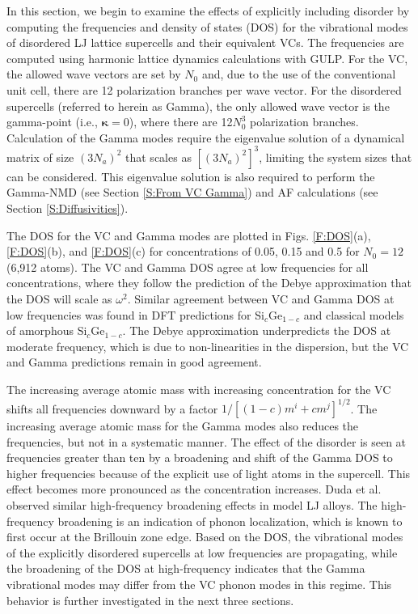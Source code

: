 \documentclass[aps,prb,onecolumn,preprint,footinbib,superscriptaddress,amsmath,amssymb,floatfix]{revtex4}
\begin{document}
In this section, we begin to examine the effects of explicitly including 
disorder by computing the frequencies and density of states (DOS)  
for the vibrational modes of disordered LJ lattice supercells and their 
equivalent VCs. The frequencies 
are computed using harmonic lattice dynamics calculations with  
GULP.\cite{gale_general_2003}  For the 
VC, the allowed wave vectors are set by $N_0$ and, due to the use of the 
conventional unit cell, there are 12 
polarization branches per wave vector.  
For the disordered supercells (referred to herein as Gamma),
the only allowed wave vector is the gamma-point (i.e., $\pmb{\kappa}=0$),  
where there are 12$N_0^3$ polarization branches. Calculation of the 
Gamma modes require the eigenvalue solution of a dynamical matrix of size 
$(3N_a)^2$ that scales as $[(3N_a)^2]^3$, limiting the system 
sizes that can be considered. This eigenvalue solution is also 
required to perform the Gamma-NMD (see Section \ref{S:From VC Gamma})  
and AF calculations (see Section \ref{S:Diffusivities}). 

The DOS for the VC and Gamma modes are plotted in Figs. \ref{F:DOS}(a), 
\ref{F:DOS}(b), and \ref{F:DOS}(c) 
for concentrations of 0.05, 0.15 and 0.5 for 
$N_0=12$ (6,912 atoms). The VC and Gamma DOS 
agree at low frequencies for all concentrations, 
where they follow the prediction of the Debye approximation that 
the DOS will scale as $\omega^2$.\cite{ashcroft_solid_1976} 
Similar agreement between VC and Gamma DOS at low frequencies 
was found in DFT predictions 
for Si$_c$Ge$_{1-c}$\cite{garg_role_2011} and 
classical models of amorphous Si$_c$Ge$_{1-c}$.
\cite{bouchard_vibrational_1988} The Debye approximation 
underpredicts the DOS at moderate frequency, which is due to 
non-linearities in the dispersion,\cite{ashcroft_solid_1976} but the 
VC and Gamma predictions remain in good agreement. 

The increasing average atomic  
mass with increasing concentration for the VC shifts all   
frequencies downward by a factor $1/[(1-c)m^i + cm^j]^{1/2}$. 
The increasing average atomic 
mass for the Gamma modes also reduces the frequencies, but not in a 
systematic manner. 
The effect of the disorder is seen at frequencies greater than 
ten by a broadening and shift of the Gamma DOS to higher frequencies 
because of the explicit use of light atoms in the supercell. This effect 
becomes more pronounced as the concentration increases.  
Duda et al. 
observed similar high-frequency broadening effects in model LJ alloys.
\cite{duda_reducing_2011} The high-frequency broadening is an indication 
of phonon localization, which is known to first occur at the 
Brillouin zone edge.\cite{chu_effect_1989} 
Based on the DOS, the vibrational modes of the explicitly disordered 
supercells at low frequencies are propagating, while the 
broadening of the DOS at high-frequency indicates that the Gamma 
vibrational modes may differ from the VC phonon modes in this regime. 
This behavior is further investigated in the next three sections. 
\end{document}

